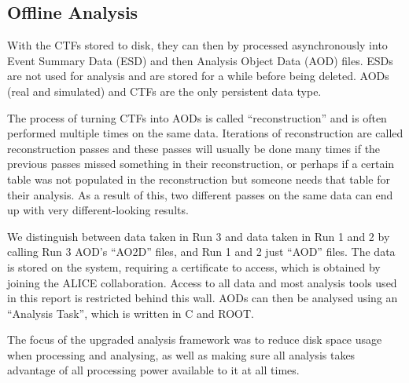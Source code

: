 \subsection{Offline Analysis}
With the CTFs stored to disk, they can then by processed asynchronously into Event Summary Data (ESD) and then Analysis Object Data (AOD) files. ESDs are not used for analysis and are stored for a while before being deleted. AODs (real and simulated) and CTFs are the only persistent data type. 

The process of turning CTFs into AODs is called ``reconstruction'' and is often performed multiple times on the same data. Iterations of reconstruction are called reconstruction passes and these passes will usually be done many times if the previous passes missed something in their reconstruction, or perhaps if a certain table was not populated in the reconstruction but someone needs that table for their analysis. As a result of this, two different passes on the same data can end up with very different-looking results. 

We distinguish between data taken in Run 3 and data taken in Run 1 and 2 by calling Run 3 AOD's ``AO2D'' files, and Run 1 and 2 just ``AOD'' files. The data is stored on the  system, requiring a certificate to access, which is obtained by joining the ALICE collaboration. Access to all data and most analysis tools used in this report is restricted behind this wall. AODs can then be analysed using an ``Analysis Task'', which is written in C\OldTexttt{++} and ROOT. 





The focus of the upgraded analysis framework was to reduce disk space usage when processing and analysing, as well as making sure all analysis takes advantage of all processing power available to it at all times.